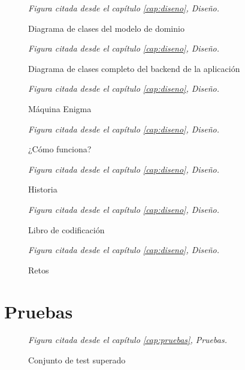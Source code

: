 \begin{figure}[H]
	\centerline{}
	\caption{Diagrama de clases del modelo de dominio}
	\label{clases_modelo}
	\par\smallskip\footnotesize\textit{Figura citada desde el capítulo \ref{cap:diseno}, Diseño.}
\end{figure}

\begin{figure}[H]
	\centerline{}
	\caption{Diagrama de clases completo del backend de la aplicación}
	\label{clases_completo}
	\par\smallskip\footnotesize\textit{Figura citada desde el capítulo \ref{cap:diseno}, Diseño.}
\end{figure}

\begin{figure}[H]
	\centerline{}
	\caption{Máquina Enigma}
	\label{pagina_principal}
	\par\smallskip\footnotesize\textit{Figura citada desde el capítulo \ref{cap:diseno}, Diseño.}
\end{figure}

\begin{figure}[H]
	\centerline{}
	\caption{¿Cómo funciona?}
	\label{funcionamiento}
	\par\smallskip\footnotesize\textit{Figura citada desde el capítulo \ref{cap:diseno}, Diseño.}
\end{figure}

\begin{figure}[H]
	\centerline{}
	\caption{Historia}
	\label{historia}
	\par\smallskip\footnotesize\textit{Figura citada desde el capítulo \ref{cap:diseno}, Diseño.}
\end{figure}

\begin{figure}[H]
	\centerline{}
	\caption{Libro de codificación}
	\label{libro}
	\par\smallskip\footnotesize\textit{Figura citada desde el capítulo \ref{cap:diseno}, Diseño.}
\end{figure}

\begin{figure}[H]
	\centerline{}
	\caption{Retos}
	\label{pruebas}
	\par\smallskip\footnotesize\textit{Figura citada desde el capítulo \ref{cap:diseno}, Diseño.}
\end{figure}

\section{Pruebas}

\begin{figure}[H]
	\centerline{}
	\caption{Conjunto de test superado}
	\label{test_superado}
	\par\smallskip\footnotesize\textit{Figura citada desde el capítulo \ref{cap:pruebas}, Pruebas.}
\end{figure}
